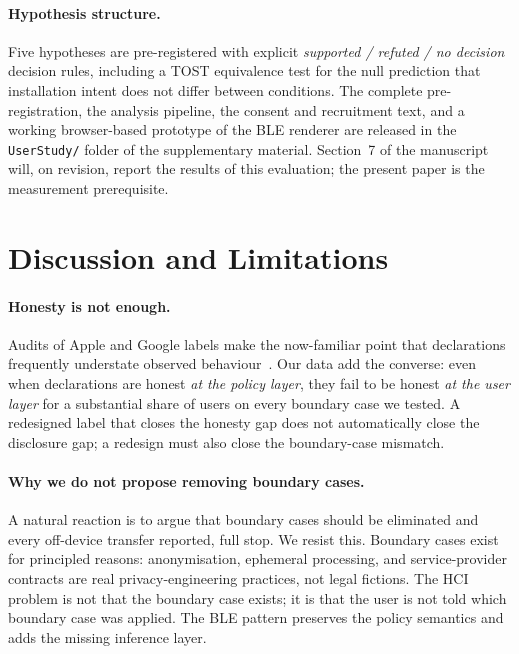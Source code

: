 \documentclass[11pt,a4paper]{article}
\makeatletter
\let\@oldsection\section
\renewcommand{\section}{\FloatBarrier\@oldsection}
\makeatother
\begin{document}
\paragraph{Hypothesis structure.}
Five hypotheses are pre-registered with explicit
\emph{supported / refuted / no decision} decision rules, including
a TOST equivalence test for the null prediction that installation
intent does not differ between conditions. The complete
pre-registration, the analysis pipeline, the consent and recruitment
text, and a working browser-based prototype of the BLE renderer
are released in the \texttt{UserStudy/} folder of the supplementary
material. Section~7 of the manuscript will, on revision, report
the results of this evaluation; the present paper is the measurement
prerequisite.

\section{Discussion and Limitations}\label{sec:discussion}

\paragraph{Honesty is not enough.}
Audits of Apple and Google labels make the now-familiar point that
declarations frequently understate observed
behaviour~\citep{koch:etal:2022,kollnig:etal:2022,
bhagavatula:etal:2023,khandelwal:etal:2023}. Our data add the
converse: even when declarations are honest \emph{at the policy
layer}, they fail to be honest \emph{at the user layer} for a
substantial share of users on every boundary case we tested. A
redesigned label that closes the honesty gap does not automatically
close the disclosure gap; a redesign must also close the
boundary-case mismatch.

\paragraph{Why we do not propose removing boundary cases.}
A natural reaction is to argue that boundary cases should be
eliminated and every off-device transfer reported, full stop. We
resist this. Boundary cases exist for principled reasons:
anonymisation, ephemeral processing, and service-provider contracts
are real privacy-engineering practices, not legal fictions. The HCI
problem is not that the boundary case exists; it is that the user is
not told which boundary case was applied. The BLE pattern preserves
the policy semantics and adds the missing inference layer.
\end{document}
